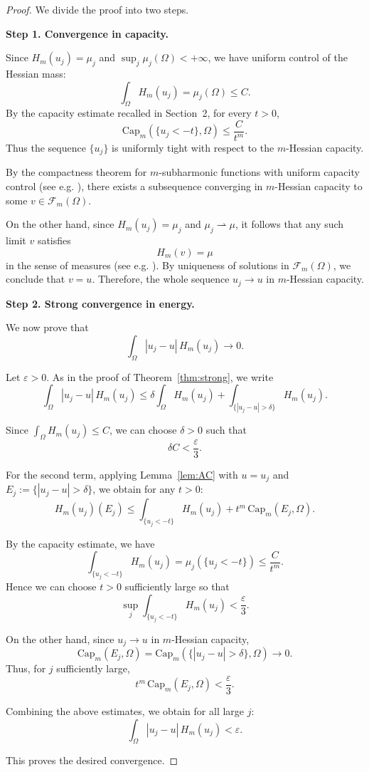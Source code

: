\documentclass[10pt,a4paper]{amsart}
\begin{document}
\begin{proof}
	We divide the proof into two steps.
	
	\medskip
	\noindent
	\textbf{Step 1. Convergence in capacity.}
	
	Since $H_m(u_j)=\mu_j$ and $\sup_j \mu_j(\Omega)<+\infty$, we have
	uniform control of the Hessian mass:
	\[
	\int_\Omega H_m(u_j) = \mu_j(\Omega) \le C.
	\]
	By the capacity estimate recalled in Section~2, for every $t>0$,
	\[
	\mathrm{Cap}_m(\{u_j<-t\},\Omega)
	\le \frac{C}{t^m}.
	\]
	Thus the sequence $\{u_j\}$ is uniformly tight with respect to the
	$m$-Hessian capacity.
	
	By the compactness theorem for $m$-subharmonic functions with uniform
	capacity control (see e.g. \cite{DinewKolodziej2014}), there exists a subsequence
	converging in $m$-Hessian capacity to some $v \in \mathcal{F}_m(\Omega)$.
	
	On the other hand, since $H_m(u_j)=\mu_j$ and $\mu_j \rightharpoonup \mu$,
	it follows that any such limit $v$ satisfies
	\[
	H_m(v) = \mu
	\]
	in the sense of measures (see e.g. \cite{DinewKolodziej2014, Lu}).
	By uniqueness of solutions in $\mathcal{F}_m(\Omega)$, we conclude that $v=u$.
	Therefore, the whole sequence $u_j \to u$ in $m$-Hessian capacity.
	
	\medskip
	\noindent
	\textbf{Step 2. Strong convergence in energy.}
	
	We now prove that
	\[
	\int_\Omega |u_j-u|\,H_m(u_j) \longrightarrow 0.
	\]
	
	Let $\varepsilon>0$. As in the proof of Theorem~\ref{thm:strong}, we write
	\[
	\int_\Omega |u_j-u|\,H_m(u_j)
	\le
	\delta \int_\Omega H_m(u_j)
	+
	\int_{\{|u_j-u|>\delta\}} H_m(u_j).
	\]
	
	Since $\int_\Omega H_m(u_j)\le C$, we can choose $\delta>0$ such that
	\[
	\delta C < \frac{\varepsilon}{3}.
	\]
	
	For the second term, applying Lemma~\ref{lem:AC} with $u=u_j$ and
	$E_j := \{|u_j-u|>\delta\}$, we obtain for any $t>0$:
	\[
	H_m(u_j)(E_j)
	\le
	\int_{\{u_j<-t\}} H_m(u_j)
	+
	t^m\,\mathrm{Cap}_m(E_j,\Omega).
	\]
	
	By the capacity estimate, we have
	\[
	\int_{\{u_j<-t\}} H_m(u_j)
	=
	\mu_j(\{u_j<-t\})
	\le \frac{C}{t^m}.
	\]
	Hence we can choose $t>0$ sufficiently large so that
	\[
	\sup_j \int_{\{u_j<-t\}} H_m(u_j)
	<
	\frac{\varepsilon}{3}.
	\]
	
	On the other hand, since $u_j \to u$ in $m$-Hessian capacity,
	\[
	\mathrm{Cap}_m(E_j,\Omega)
	=
	\mathrm{Cap}_m(\{|u_j-u|>\delta\},\Omega)
	\longrightarrow 0.
	\]
	Thus, for $j$ sufficiently large,
	\[
	t^m\,\mathrm{Cap}_m(E_j,\Omega)
	<
	\frac{\varepsilon}{3}.
	\]
	
	Combining the above estimates, we obtain for all large $j$:
	\[
	\int_\Omega |u_j-u|\,H_m(u_j)
	<
	\varepsilon.
	\]
	
	This proves the desired convergence.
\end{proof}
\end{document}

